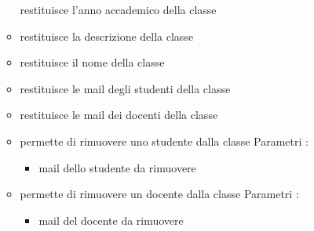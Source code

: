 \begin{itemize}
\begin{itemize}
restituisce l'anno accademico della classe
\newline
\item {}
\newline
restituisce la descrizione della classe
\newline
\item {}
\newline
restituisce il nome della classe
\newline
\item {}
\newline
restituisce le mail degli studenti della classe
\newline
\item {}
\newline
restituisce le mail dei docenti della classe
\newline
\item {}
\newline
permette di rimuovere uno studente dalla
classe
\newline
Parametri :
\begin{itemize}
\item {}
\newline
mail dello studente da rimuovere
\end{itemize}
\item {}
\newline
permette di rimuovere un docente dalla
classe
\newline
Parametri :
\begin{itemize}
\item {}
\newline
mail del docente da rimuovere
\end{itemize}
\end{itemize}
\end{itemize}
